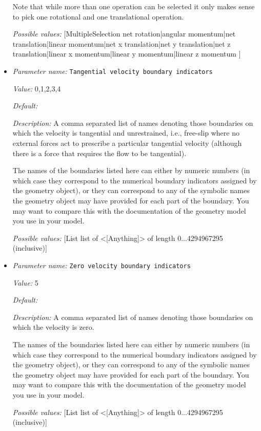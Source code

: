 \begin{itemize}
Note that while more than one operation can be selected it only makes sense to pick one rotational and one translational operation.


{\it Possible values:} [MultipleSelection net rotation|angular momentum|net translation|linear momentum|net x translation|net y translation|net z translation|linear x momentum|linear y momentum|linear z momentum ]
\item {\it Parameter name:} {\tt Tangential velocity boundary indicators}
\label{parameters:Model settings/Tangential velocity boundary indicators}


{\it Value:} 0,1,2,3,4


{\it Default:} 


{\it Description:} A comma separated list of names denoting those boundaries on which the velocity is tangential and unrestrained, i.e., free-slip where no external forces act to prescribe a particular tangential velocity (although there is a force that requires the flow to be tangential).

The names of the boundaries listed here can either by numeric numbers (in which case they correspond to the numerical boundary indicators assigned by the geometry object), or they can correspond to any of the symbolic names the geometry object may have provided for each part of the boundary. You may want to compare this with the documentation of the geometry model you use in your model.


{\it Possible values:} [List list of <[Anything]> of length 0...4294967295 (inclusive)]
\item {\it Parameter name:} {\tt Zero velocity boundary indicators}
\label{parameters:Model settings/Zero velocity boundary indicators}


{\it Value:} 5


{\it Default:} 


{\it Description:} A comma separated list of names denoting those boundaries on which the velocity is zero.

The names of the boundaries listed here can either by numeric numbers (in which case they correspond to the numerical boundary indicators assigned by the geometry object), or they can correspond to any of the symbolic names the geometry object may have provided for each part of the boundary. You may want to compare this with the documentation of the geometry model you use in your model.


{\it Possible values:} [List list of <[Anything]> of length 0...4294967295 (inclusive)]
\end{itemize}


